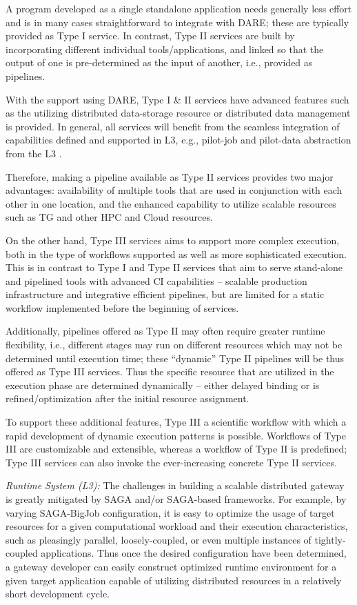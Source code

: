 \documentclass[]{article}
\begin{document}
A program developed as a single standalone application needs generally
less effort and is in many cases straightforward to integrate with
DARE; these are typically provided as Type I service.  In contrast,
Type II services are built by incorporating different individual
tools/applications, and linked so that the output of one is
pre-determined as the input of another, i.e., provided as pipelines.

With the support using DARE, Type I \& II services have advanced features such as the utilizing distributed
data-storage resource or distributed data management is provided.  In
general, all services will benefit from the seamless integration of
capabilities defined and supported in L3, e.g., pilot-job and
pilot-data abstraction from the L3 \cite{troy-escience11}.

Therefore, making a pipeline available as Type II services provides
two major advantages: availability of multiple tools that are used in
conjunction with each other in one location, and the enhanced
capability to utilize scalable resources such as TG and other HPC and
Cloud resources.

On the other hand, Type III services aims to support more complex
execution, both in the type of workflows supported as well as more
sophisticated execution.  This is in contrast to Type I and Type II
services that aim to serve stand-alone and pipelined tools with advanced CI
capabilities -- scalable production infrastructure and integrative
efficient pipelines, but are limited for a static workflow implemented before the beginning of services.

Additionally, pipelines offered as Type II may often require greater
runtime flexibility, i.e., different stages may run on different
resources which may not be determined until execution time; these
``dynamic'' Type II pipelines will be thus offered as Type III
services.  Thus the specific resource that are utilized in the
execution phase are determined dynamically -- either delayed binding
or is refined/optimization after the initial resource assignment.

To support these additional features, Type III  a scientific
workflow with which a rapid development of dynamic execution
patterns is possible.  Workflows of Type III are customizable and
extensible, whereas a workflow of Type II is predefined; Type III
services can also invoke the ever-increasing concrete Type II
services.


\textit{Runtime System (L3):}  The challenges in building a scalable
distributed gateway is greatly mitigated by SAGA and/or SAGA-based
frameworks.  For example, by varying SAGA-BigJob configuration, it is
easy to optimize the usage of target resources for a given
computational workload and their execution characteristics, such as
pleasingly parallel, loosely-coupled, or even multiple instances of
tightly-coupled applications.  Thus once the desired configuration
have been determined, a gateway developer can easily construct
optimized runtime environment for a given target application capable
of utilizing distributed resources in a relatively short development
cycle.
\end{document}
